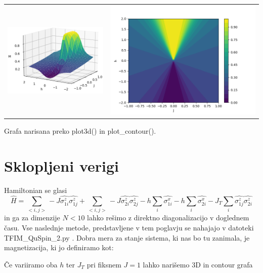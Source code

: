 \documentclass{article}
\begin{document}
\begin{tabular}{c c}
     \includegraphics[width = .5 \linewidth]{STFIM2.png}
     &  
     \includegraphics[width = .5 \linewidth]{STFIM3.png}\\
\end{tabular}
Grafa narisana preko plot3d() in plot\_contour().


\section{Sklopljeni verigi}
Hamiltonian se glasi
\begin{equation}
    \hat{H} = \sum_{< i,j >} -J \hat{\sigma_{1i}^z} \hat{\sigma_{1j}^z} + \sum_{< i,j >} -J \hat{\sigma_{2i}^z} \hat{\sigma_{2j}^z} - h\sum_i \hat{\sigma_{1i}^x}- h\sum_i \hat{\sigma_{2i}^x} - J_T \sum_i \hat{\sigma_{1j}^z} \hat{\sigma_{2i}^z}
\end{equation}
in ga za dimenzije $N < 10$ lahko rešimo z direktno diagonalizacijo v doglednem času. Vse naslednje metode, predstavljene v tem poglavju se nahajajo v datoteki TFIM\_QuSpin\_2.py . Dobra mera za stanje sistema, ki nas bo tu zanimala, je magnetizacija, ki jo definiramo kot:

\noindent Če variiramo oba $h$ ter $J_T$ pri fiksnem $J = 1$ lahko narišemo 3D in contour grafa\\\\
\end{document}
